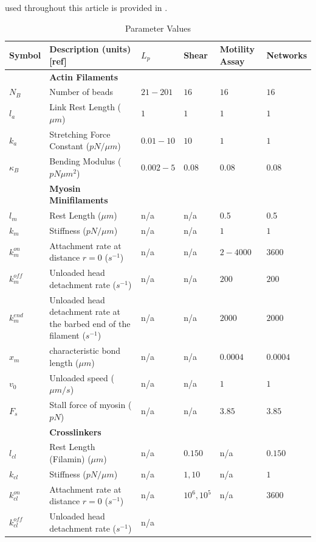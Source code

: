 \documentclass[12pt]{article} \usepackage{times} \usepackage{graphicx}
\begin{document}
used throughout this article is provided in .  \begin{table}
  \caption{Parameter Values} \centering
  \begin{tabular}{|C{1cm}|L{6cm}|C{2cm}|C{2cm}|C{2cm}|C{2cm}|} \hline\hline
    Symbol & Description (units) [ref] & $L_p$ & Shear & Motility Assay &
    Networks\\ \hline &\bf{Actin Filaments}& & & &\\ \hline $N_B$ & Number of
    beads & $21-201$ & $16$ & $16$ &$16$\\ $l_a$ & Link Rest Length ($\mu
    m$)\cite{odijk1983}& $1$ & $1$ &$1$& $1$\\ $k_a$ & Stretching Force
    Constant ($pN/\mu m$) & $0.01-10$ & $10$ & $1$ & $1$\\ $\kappa_B$ & Bending
    Modulus ($pN\mu m^2$)\cite{ott1993} & $0.002-5 $ & $0.08$ & $0.08$ &
    $0.08$\\ \hline &\bf{Myosin Minifilaments}& & \\ \hline $l_m$ & Rest Length
    ($\mu m$)\cite{niederman1975} & n/a & n/a & 0.5 & 0.5\\ $k_m$ & Stiffness
    ($pN/\mu m$)& n/a & n/a & $1$ & $1$\\ $k^{on}_m$ & Attachment rate at
    distance $r=0$ ($s^{-1}$)& n/a & n/a &$2-4000$ &$3600$\\ $k^{off}_m$ &
    Unloaded head detachment rate ($s^{-1}$)& n/a & n/a & $200$ &$200$\\
    $k^{end}_m$ & Unloaded head detachment rate at the barbed end of the
    filament ($s^{-1}$)& n/a & n/a &$2000$ &$2000$\\ $x_m$ & characteristic
    bond length ($\mu m$) \cite{stam2015}& n/a & n/a & $0.0004$& $0.0004$\\
    $v_0$ & Unloaded speed ($\mu m/s$) \cite{kron1986}&  n/a & n/a & $1$ &
    $1$\\ $F_s$ & Stall force of myosin ($pN$)\cite{veigel2003}& n/a & n/a &
    $3.85$ & $3.85$\\ \hline &\bf{Crosslinkers} & & \\ \hline $l_{cl}$& Rest
    Length (Filamin) ($\mu m$)\cite{ferrer2008} & n/a &$0.150$ &n/a&$0.150$ \\
    $k_{cl}$ & Stiffness ($pN/\mu m$)& n/a & $1,10$ & n/a& $1$\\ $k^{on}_{cl}$
    & Attachment rate at distance $r=0$ ($s^{-1}$)& n/a & $10^6,10^5$ &n/a
    &$3600$\\ $k^{off}_{cl}$ & Unloaded head detachment rate ($s^{-1}$)& n/a &

\end{tabular}
\end{table}
\end{document}

